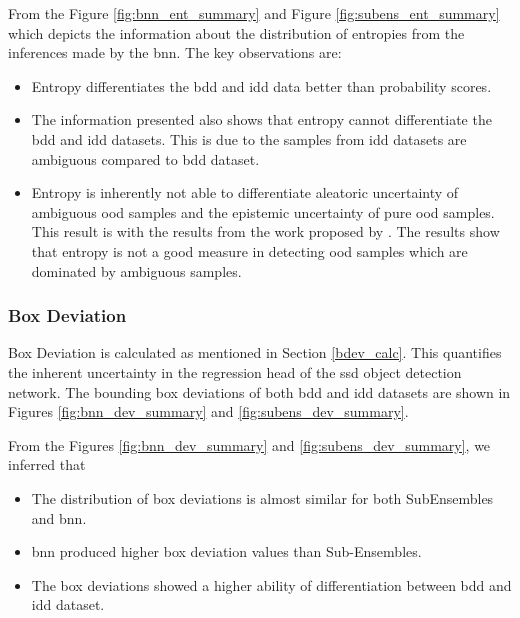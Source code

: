     From the Figure \ref{fig:bnn_ent_summary} and Figure \ref{fig:subens_ent_summary} which depicts the information about the distribution of entropies from the inferences made by the \acrshort{bnn}. The key observations are:
    
    \begin{itemize}
        \item Entropy differentiates the \acrshort{bdd} and \acrshort{idd} data better than probability scores.
        \item The information presented also shows that entropy cannot differentiate the \acrshort{bdd} and \acrshort{idd} datasets. This is due to the samples from \acrshort{idd} datasets are ambiguous compared to \acrshort{bdd} dataset. 
        \item Entropy is inherently not able to differentiate aleatoric uncertainty of ambiguous \acrshort{ood} samples and the epistemic uncertainty of pure \acrshort{ood} samples. This result is with the results from the work proposed by \citet{kirsch2021pitfalls}. The results show that entropy is not a good measure in detecting \acrshort{ood} samples which are dominated by ambiguous samples.
    \end{itemize}
    
    
    \subsubsection{Box Deviation}
    Box Deviation is calculated as mentioned in Section \ref{bdev_calc}. This quantifies the inherent uncertainty in the regression head of the \acrshort{ssd} object detection network. The bounding box deviations of both \acrshort{bdd} and \acrshort{idd} datasets are shown in Figures \ref{fig:bnn_dev_summary} and \ref{fig:subens_dev_summary}.
    
    From the Figures \ref{fig:bnn_dev_summary} and \ref{fig:subens_dev_summary}, we inferred that
    \begin{itemize}
        \item The distribution of box deviations is almost similar for both SubEnsembles and \acrshort{bnn}.
        \item \acrshort{bnn} produced higher box deviation values than Sub-Ensembles.
        \item The box deviations showed a higher ability of differentiation between \acrshort{bdd} and \acrshort{idd} dataset.
    \end{itemize}
    
